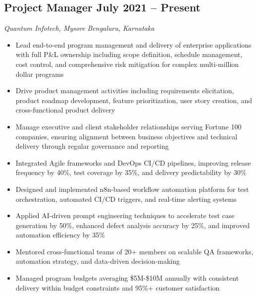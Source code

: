 \documentclass[11pt,a4paper]{article}
\begin{document}
\subsection*{Project Manager \hfill \normalfont July 2021 -- Present}
\textit{Quantum Infotech, Mysore} \hfill \textit{Bengaluru, Karnataka}
\begin{itemize}[leftmargin=*, itemsep=2pt]
    \item Lead end-to-end program management and delivery of enterprise applications with full P\&L ownership including scope definition, schedule management, cost control, and comprehensive risk mitigation for complex multi-million dollar programs
    \item Drive product management activities including requirements elicitation, product roadmap development, feature prioritization, user story creation, and cross-functional product delivery
    \item Manage executive and client stakeholder relationships serving Fortune 100 companies, ensuring alignment between business objectives and technical delivery through regular governance and reporting
    \item Integrated Agile frameworks and DevOps CI/CD pipelines, improving release frequency by 40\%, test coverage by 35\%, and delivery predictability by 30\%
    \item Designed and implemented n8n-based workflow automation platform for test orchestration, automated CI/CD triggers, and real-time alerting systems
    \item Applied AI-driven prompt engineering techniques to accelerate test case generation by 50\%, enhanced defect analysis accuracy by 25\%, and improved automation efficiency by 35\%
    \item Mentored cross-functional teams of 20+ members on scalable QA frameworks, automation strategy, and data-driven decision-making
    \item Managed program budgets averaging \$5M-\$10M annually with consistent delivery within budget constraints and 95\%+ customer satisfaction
\end{itemize}
\end{document}
